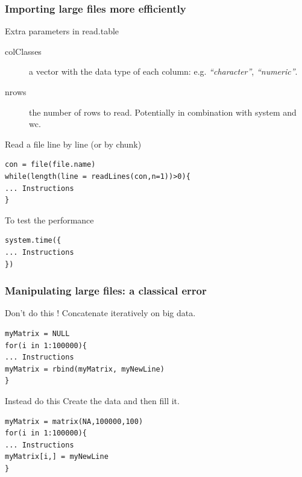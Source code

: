 \documentclass[10pt]{beamer}
\newenvironment{xframe}[2][]
  {\begin{frame}[fragile,environment=xframe,#1]
  \frametitle{#2}}
  {\end{frame}}
\begin{document}

\begin{xframe}{Importing large files more efficiently}
  \begin{block}{Extra parameters in {\sf read.table}}
    \begin{description}
    \item[colClasses] a {\sf vector} with the data type of each column: e.g. {\it ``character''}, {\it ``numeric''}.
    \item[nrows] the number of rows to read. {\tiny Potentially in combination with {\sf system} and {\sf wc}.}
    \end{description}
  \end{block}
  \begin{block}{Read a file line by line (or by chunk)}
\begin{verbatim}
con = file(file.name)
while(length(line = readLines(con,n=1))>0){
... Instructions
}
\end{verbatim}      
  \end{block}
  \begin{alertblock}{To test the performance}
\begin{verbatim}
system.time({
... Instructions
})
\end{verbatim}  
  \end{alertblock}
\end{xframe}


\begin{xframe}{Manipulating large files: a classical error}
  \begin{alertblock}{Don't do this !}
    Concatenate iteratively on big data.

\begin{verbatim}
myMatrix = NULL
for(i in 1:100000){
... Instructions
myMatrix = rbind(myMatrix, myNewLine)
}
\end{verbatim}  
  \end{alertblock}
  \begin{exampleblock}{Instead do this}
    Create the data and then fill it.

\begin{verbatim}
myMatrix = matrix(NA,100000,100)
for(i in 1:100000){
... Instructions
myMatrix[i,] = myNewLine
}
\end{verbatim}  
  \end{exampleblock}
\end{xframe}

\end{document}
